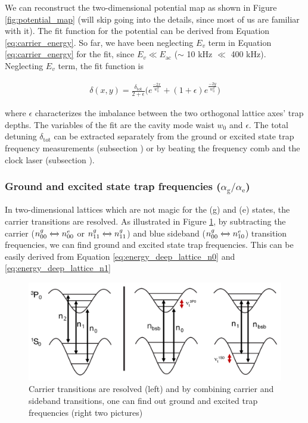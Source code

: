 		We can reconstruct the two-dimensional potential map as shown in Figure \ref{fig:potential_map} (will skip going into the details, since most of us are familiar with it). The fit function for the potential can be derived from Equation \ref{eq:carrier_energy}. So far, we have been neglecting $E_{v}$ term in Equation \ref{eq:carrier_energy} for the fit, since $E_{v} \ll E_{\text{ac}}$ ($\sim$ 10 kHz $\ll$ 400 kHz). Neglecting $E_{v}$ term, the fit function is 

		\begin{align*}
			\delta(x,y)=\frac{\delta_{\text{tot}}}{2+\epsilon}\bigg(e^{\frac{-2x}{w^{2}_{0}}}+(1+\epsilon)e^{\frac{-2y}{w^{2}_{0}}}\bigg)
		\end{align*}

		\noindent where $\epsilon$ characterizes the imbalance between the two orthogonal lattice axes' trap depths. The variables of the fit are the cavity mode waist $w_{0}$ and $\epsilon$. The total detuning $\delta_{\text{tot}}$ can be extracted separately from the ground or excited state trap frequency measurements (subsection \textbf{}) or by beating the frequency comb and the clock laser (subsection \textbf{}).

	\subsubsection{Ground and excited state trap frequencies ($\alpha_{\text{g}}/\alpha_{\text{e}}$)}
		\label{subsection:trap_freq}

		In two-dimensional lattices which are not magic for the \SSZ (g) and \TPZ (e) states, the carrier transitions are resolved. As illustrated in Figure \ref{fig:trap_frequency_schematics}, by subtracting the carrier ($n^{g}_{00}\xleftrightarrow{} n^{e}_{00}$ or $n^{g}_{11}\xleftrightarrow{} n^{g}_{11}$) and blue sideband ($n^{g}_{00}\xleftrightarrow{} n^{e}_{10}$) transition frequencies, we can find ground and excited state trap frequencies. This can be easily derived from Equation \ref{eq:energy_deep_lattice_n0} and \ref{eq:energy_deep_lattice_n1}

		\begin{figure}
		    \centering
		    \includegraphics[scale=0.8]{figures/trap_frequency_schematics.pdf}
		    \caption{Carrier transitions are resolved (left) and by combining carrier and sideband transitions, one can find out ground and excited trap frequencies (right two pictures)}
		    \label{fig:trap_frequency_schematics}
		\end{figure}

